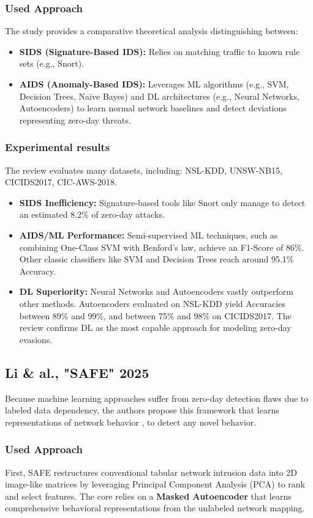 \documentclass[12pt, a4paper]{report}
\begin{document}
\subsubsection{Used Approach }
The study provides a comparative theoretical analysis distinguishing between:
\begin{itemize}
    \item \textbf{SIDS (Signature-Based IDS):} Relies on matching traffic to known rule sets (e.g., Snort).
    \item \textbf{AIDS (Anomaly-Based IDS):} Leverages ML algorithms (e.g., SVM, Decision Trees, Naive Bayes) and DL architectures (e.g., Neural Networks, Autoencoders) to learn normal network baselines and detect deviations representing zero-day threats.
\end{itemize}

\subsubsection{Experimental results}
The review evaluates many datasets, including:  NSL-KDD, UNSW-NB15, CICIDS2017, CIC-AWS-2018.
\begin{itemize}
    \item \textbf{SIDS Inefficiency:} Signature-based tools like Snort only manage to detect an estimated 8.2\% of zero-day attacks.
    \item \textbf{AIDS/ML Performance:} Semi-supervised ML techniques, such as combining One-Class SVM with Benford's law, achieve an F1-Score of 86\%. Other classic classifiers like SVM and Decision Trees reach around 95.1\% Accuracy.
    \item \textbf{DL Superiority:} Neural Networks and Autoencoders vastly outperform other methods. Autoencoders evaluated on NSL-KDD yield Accuracies between 89\% and 99\%, and between 75\% and 98\% on CICIDS2017. The review confirms DL as the most capable approach for modeling zero-day evasions.
\end{itemize}

\subsection{Li \& al., "SAFE" 2025}
Because machine learning approaches suffer from zero-day detection flaws due to labeled data dependency, the authors propose \cite{safe2025} this framework that learns representations of network behavior , to detect any novel behavior.
\subsubsection{Used Approach} 
First, SAFE restructures conventional tabular network intrusion data into 2D image-like matrices by leveraging Principal Component Analysis (PCA) to rank and select features. The core relies on a \textbf{Masked Autoencoder} that learns comprehensive behavioral representations from the unlabeled network mapping.
\end{document}
